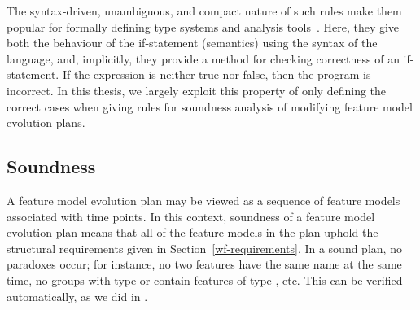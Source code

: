The syntax-driven, unambiguous, and compact nature of such rules make them popular for formally defining type systems and analysis tools~\cite{book:principles-of-program-analysis}. Here, they give both the behaviour of the if-statement (semantics) using the syntax of the language, and, implicitly, they provide a method for checking correctness of an if-statement. If the expression is neither true nor false, then the program is incorrect. In this thesis, we largely exploit this property of only defining the correct cases when giving rules for soundness analysis of modifying feature model evolution plans.



\subsection{Soundness}
A feature model evolution plan may be viewed as a sequence of feature models associated with time points. 
In this context, soundness of a feature model evolution plan means that all of the feature models in the plan uphold the structural requirements  given in Section~\vref{wf-requirements}. In a sound plan, no paradoxes occur; for instance, no two features have the same name at the same time, no groups with type \xortype{} or \ortype{} contain features of type \mandatory{}, etc. This can be verified automatically, as we did in \cite{art:consistency-preserving-evolution-planning}.
